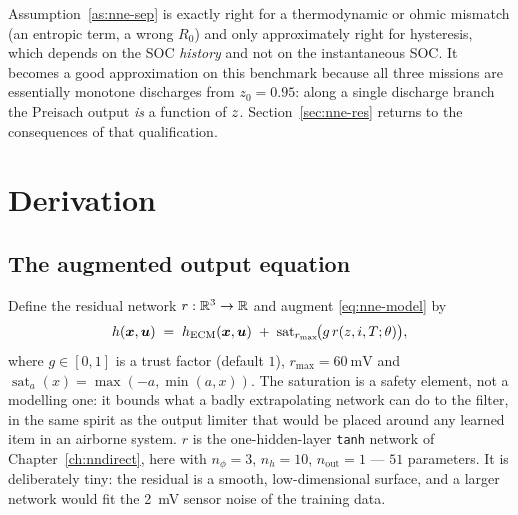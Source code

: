 Assumption~\ref{as:nne-sep} is exactly right for a thermodynamic or ohmic mismatch (an entropic
term, a wrong $R_0$) and only approximately right for hysteresis, which depends on the SOC
\emph{history} and not on the instantaneous SOC.  It becomes a good approximation on this
benchmark because all three missions are essentially monotone discharges from $z_0 = 0.95$: along a
single discharge branch the Preisach output \emph{is} a function of $z$.  Section~\ref{sec:nne-res}
returns to the consequences of that qualification.

\section{Derivation}

\subsection{The augmented output equation}
Define the residual network $r:\mathbb{R}^3\to\mathbb{R}$ and augment \cref{eq:nne-model} by
\begin{equation}\label{eq:nne-h}
h(\bm{x},\bm{u}) \;=\; h_{\mathrm{ECM}}(\bm{x},\bm{u}) \;+\;
\operatorname{sat}_{r_{\max}}\!\bigl(g\, r(z, i, T;\theta)\bigr),
\end{equation}
where $g\in[0,1]$ is a trust factor (default $1$), $r_{\max} = \SI{60}{\milli\volt}$ and
$\operatorname{sat}_{a}(x) = \max(-a,\min(a,x))$.  The saturation is a safety element, not a
modelling one: it bounds what a badly extrapolating network can do to the filter, in the same
spirit as the output limiter that would be placed around any learned item in an airborne system.
$r$ is the one-hidden-layer \texttt{tanh} network of Chapter~\ref{ch:nndirect}, here with
$n_\phi = 3$, $n_h = 10$, $n_{\text{out}} = 1$ --- $\num{51}$ parameters.  It is deliberately tiny:
the residual is a smooth, low-dimensional surface, and a larger network would fit the
\SI{2}{\milli\volt} sensor noise of the training data.

